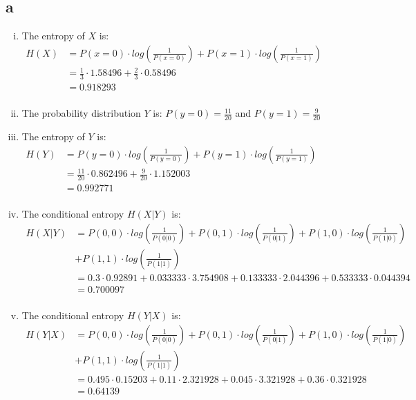 \documentclass[letterpaper,notitlepage,twoside]{article}
\begin{document}
\subsection*{a}
\begin{enumerate}[(i)]

\item The entropy of  $X$ is:\\
$\begin{aligned}
H(X) &= P(x = 0) \cdot log(\frac{1}{P(x = 0)}) + P(x = 1) \cdot log(\frac{1}{P(x = 1)}) \\
&= \frac{1}{3} \cdot 1.58496 + \frac{2}{3} \cdot 0.58496 \\
&= 0.918293 \\ 
\end{aligned}$

\item The probability distribution $Y$ is: $P(y = 0) = \frac{11}{20}$ and $P(y = 1) = \frac{9}{20}$ \\

\item The entropy of $Y$ is: \\
$\begin{aligned}
H(Y) &= P(y = 0) \cdot log(\frac{1}{P(y = 0)}) + P(y = 1) \cdot log(\frac{1}{P(y = 1)}) \\
&= \frac{11}{20} \cdot 0.862496 + \frac{9}{20} \cdot 1.152003 \\
&= 0.992771 \\
\end{aligned}$

\item The conditional entropy $H(X | Y)$ is: \\
$\begin{aligned}
H(X|Y) &= P(0,0) \cdot log(\frac{1}{P(0|0)}) + P(0,1) \cdot log(\frac{1}{P(0|1)}) + P(1,0) \cdot log(\frac{1}{P(1|0)}) \\ 
&+ P(1,1) \cdot log(\frac{1}{P(1|1)}) \\
&= 0.3 \cdot 0.92891 + 0.033333 \cdot 3.754908 + 0.133333 \cdot 2.044396 + 0.533333 \cdot 0.044394 \\
&= 0.700097 \\
\end{aligned}$

\item The conditional entropy $H(Y | X)$ is: \\
$\begin{aligned}
H(Y|X) &= P(0,0) \cdot log(\frac{1}{P(0|0)}) + P(0,1) \cdot log(\frac{1}{P(0|1)}) + P(1,0) \cdot log(\frac{1}{P(1|0)}) \\ &+ P(1,1) \cdot log(\frac{1}{P(1|1)}) \\
&= 0.495 \cdot 0.15203 + 0.11 \cdot 2.321928 + 0.045 \cdot 3.321928 + 0.36 \cdot 0.321928 \\
&= 0.64139 \\
\end{aligned}$


\end{enumerate}
\end{document}
